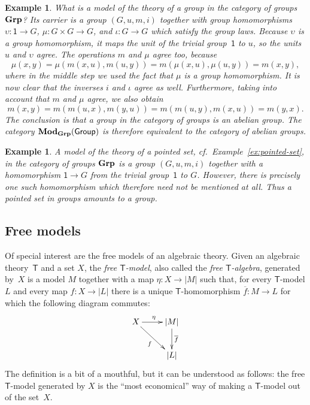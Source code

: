 \documentclass{amsart}
\newcommand{\theory}[1]{\mathsf{#1}} %
\newcommand{\ModC}[2]{\text{\textbf{Mod}}_{#1}(\theory{#2})} %
\newcommand{\category}[1]{\text{\textbf{#1}}} %
\newcommand{\carrier}[1]{|#1|} %
\newcommand{\one}{\mathsf{1}} %
\newtheorem{example}[definition]{Example}
\begin{document}
\begin{example}
  What is a model of the theory of a group in the category of groups $\category{Grp}$? Its
  carrier is a group $(G, u, m, i)$ together with group homomorphisms
  $\upsilon : \one \to G$, $\mu : G \times G \to G$, and $\iota : G \to G$ which satisfy
  the group laws. Because $\upsilon$ is a group homomorphism, it maps the unit of the
  trivial group~$\one$ to $u$, so the units $u$ and $\upsilon$ agree. The operations $m$
  and $\mu$ agree too, because
  \begin{equation*}
    \mu(x, y) =
    \mu(m(x, u), m(u, y)) =
    m(\mu(x, u), \mu(u, y)) =
    m(x, y),
  \end{equation*}
  where in the middle step we used the fact that $\mu$ is a group homomorphism. It is now
  clear that the inverses $i$ and $\iota$ agree as well. Furthermore, taking into account
  that $m$ and $\mu$ agree, we also obtain
  \begin{equation*}
    m(x, y) =
    m(m(u, x), m(y, u)) =
    m(m(u, y), m(x, u)) =
    m(y, x).
  \end{equation*}
  The conclusion is that a group in the category of groups is an abelian group. The
  category $\ModC{\category{Grp}}{Group}$ is therefore equivalent to the category of abelian groups.
\end{example}

\begin{example}
  A model of the theory of a pointed set, cf.\ Example~\ref{ex:pointed-set}, in the
  category of groups $\category{Grp}$ is a group $(G, u, m, i)$ together with a
  homomorphism $\one \to G$ from the trivial group~$\one$ to $G$. However, there is
  precisely one such homomorphism which therefore need not be mentioned at all. Thus a
  pointed set in groups amounts to a group.
\end{example}


\subsection{Free models}
\label{sec:free-models}

Of special interest are the free models of an algebraic theory. Given an
algebraic theory~$\theory{T}$ and a set $X$, the \emph{free $\theory{T}$-model},
also called the \emph{free $\theory{T}$-algebra}, generated by~$X$ is a model
$M$ together with a map $\eta : X \to \carrier{M}$ such that, for every
$\theory{T}$-model $L$ and every map $f : X \to \carrier{L}$ there is a unique
$\theory{T}$-homomorphism $\overline{f} : M \to L$ for which the following
diagram commutes:
%
\begin{equation*}
  \xymatrix{
    {X}
    \ar[r]^{\eta}
    \ar[rd]_{f}
    &
    {\carrier{M}}
    \ar[d]^{\overline{f}}
    \\
    &
     \carrier{L}
  }
\end{equation*}
%
The definition is a bit of a mouthful, but it can be understood as follows: the
free $\theory{T}$-model generated by $X$ is the ``most economical'' way of
making a $\theory{T}$-model out of the set~$X$.
\end{document}
